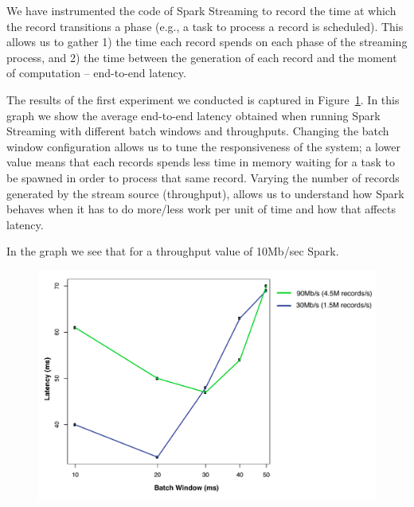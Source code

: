 We have instrumented the code of Spark Streaming to record the time at which the record transitions a phase (e.g., a task to process a record is scheduled).
This allows us to gather 1) the time each record spends on each phase of the streaming process, and 2) the time between the generation of each record and the moment of computation -- end-to-end latency.


The results of the first experiment we conducted is captured in Figure~\ref{fig:Batchsize_vs_latency}.
In this graph we show the average end-to-end latency obtained when running Spark Streaming with different batch windows and throughputs. 
Changing the batch window configuration allows us to tune the responsiveness of the system; a lower value means that each records spends less time in memory waiting for a task to be spawned in order to process that same record. 
Varying the number of records generated by the stream source (throughput), allows us to understand how 
Spark behaves when it has to do more/less work per unit of time and how that affects latency.

In the graph we see that for a throughput value of 10Mb/sec Spark.

\begin{figure}[t!]
  \begin{center}
    \includegraphics[scale=0.35]{images_graphs/batchsize_vs_latency/batchsize_vs_latency_illustrator.pdf}
  \end{center}
  \caption{}
  \label{fig:Batchsize_vs_latency}
\end{figure}
